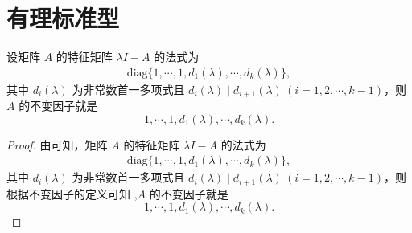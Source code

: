 \documentclass[../../main.tex]{subfiles}
\begin{document}
\section{有理标准型}\label{section:有理标准型}

\begin{proposition}\label{proposition:特征矩阵的法式和不变因子}
设矩阵 $A$ 的特征矩阵 $\lambda I - A$ 的法式为
\begin{align*}
\mathrm{diag}\{1,\cdots,1,d_1(\lambda),\cdots,d_k(\lambda)\},
\end{align*}
其中 $d_i(\lambda)$ 为非常数首一多项式且 $d_i(\lambda)\mid d_{i + 1}(\lambda)\ (i = 1, 2, \cdots, k - 1)$，则 $A$ 的不变因子就是
\[
1,\cdots,1,d_1(\lambda),\cdots,d_k(\lambda).
\] 
\end{proposition}
\begin{proof}
由可知，矩阵 $A$ 的特征矩阵 $\lambda I - A$ 的法式为
\begin{align*}
\mathrm{diag}\{1,\cdots,1,d_1(\lambda),\cdots,d_k(\lambda)\},
\end{align*}
其中 $d_i(\lambda)$ 为非常数首一多项式且 $d_i(\lambda)\mid d_{i + 1}(\lambda)\ (i = 1, 2, \cdots, k - 1)$，则根据不变因子的定义可知 ,$A$ 的不变因子就是
\[
1,\cdots,1,d_1(\lambda),\cdots,d_k(\lambda).
\] 

\end{proof}
\end{document}
